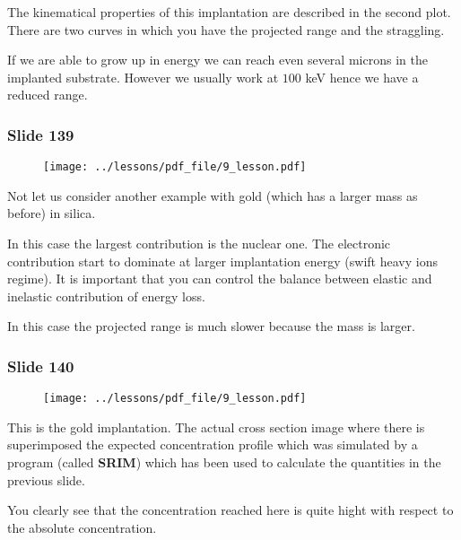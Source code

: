\documentclass[../main/main.tex]{subfiles}
\begin{document}
The kinematical properties of this implantation are described in the second plot. There are two curves in which you have the projected range and the straggling.

If we are able to grow up in energy we can reach even several microns in the implanted substrate. However we usually work at \( 100 \) keV hence we have a reduced range.

\newpage

\subsubsection{Slide 139}

\begin{figure}[h!]
\centering
\texttt{[image: ../lessons/pdf\_file/9\_lesson.pdf]}
\end{figure}

Not let us consider another example with gold (which has a larger mass as before) in silica.

In this case the largest contribution is the nuclear one. The electronic contribution start to dominate at larger implantation energy (swift heavy ions regime). It is important that you can control the balance between elastic and inelastic contribution of energy loss.

In this case the projected range is much slower because the mass is larger.

\newpage

\subsubsection{Slide 140}

\begin{figure}[h!]
\centering
\texttt{[image: ../lessons/pdf\_file/9\_lesson.pdf]}
\end{figure}

This is the gold implantation. The actual cross section image where there is superimposed the expected concentration profile which was simulated by a program (called \textbf{SRIM}) which has been used to calculate the quantities in the previous slide.

You clearly see that the concentration reached here is quite hight with respect to the absolute concentration.
\end{document}
